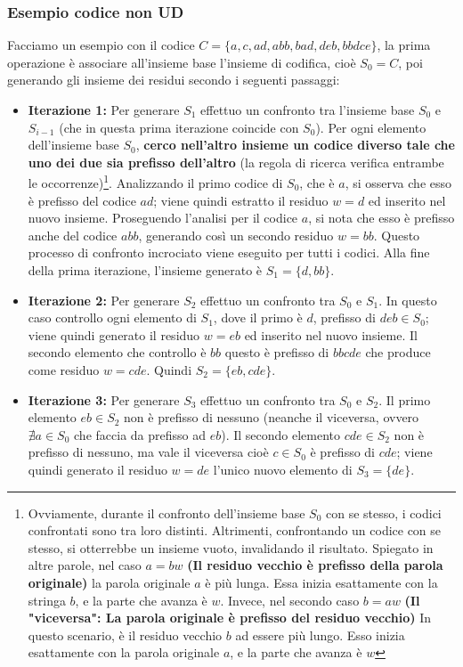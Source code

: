 \documentclass{article}
\theoremstyle{definition}
\numberwithin{equation}{section}
\begin{document}
\subsubsection{Esempio codice non UD}\label{example_sardinas_patterson_not_ud}
Facciamo un esempio con il codice $C=\{a,c,ad,abb,bad,deb,bbdce\}$, la prima operazione è associare all'insieme base l'insieme di codifica, cioè $S_0 = C$, poi generando gli insieme dei residui secondo i seguenti passaggi:
\begin{itemize}
    \item \textbf{Iterazione 1:}  Per generare $S_1$ effettuo un confronto tra l'insieme base $S_0$ e $S_{i-1}$ (che in questa prima iterazione coincide con $S_0$). Per ogni elemento dell'insieme base $S_0$, \textbf{cerco nell'altro insieme un codice diverso tale che uno dei due sia prefisso dell'altro} (la regola di ricerca verifica entrambe le occorrenze)\footnote{Ovviamente, durante il confronto dell'insieme base $S_0$ con se stesso, i codici confrontati sono tra loro distinti. Altrimenti, confrontando un codice con se stesso, si otterrebbe un insieme vuoto, invalidando il risultato. Spiegato in altre parole, nel caso $a=bw$ \textbf{(Il residuo vecchio è prefisso della parola originale)} la parola originale $a$ è più lunga. Essa inizia esattamente con la stringa $b$, e la parte che avanza è $w$. Invece, nel secondo caso $b=aw$ \textbf{(Il "viceversa": La parola originale è prefisso del residuo vecchio)} In questo scenario, è il residuo vecchio $b$ ad essere più lungo. Esso inizia esattamente con la parola originale $a$, e la parte che avanza è $w$}. Analizzando il primo codice di $S_0$, che è $a$, si osserva che esso è prefisso del codice $ad$; viene quindi estratto il residuo $w = d$ ed inserito nel nuovo insieme. Proseguendo l'analisi per il codice $a$, si nota che esso è prefisso anche del codice $abb$, generando così un secondo residuo $w = bb$. Questo processo di confronto incrociato viene eseguito per tutti i codici. Alla fine della prima iterazione, l'insieme generato è $S_1 = \{d, bb\}$.
    \item \textbf{Iterazione 2:} Per generare $S_2$ effettuo un confronto tra $S_0$ e $S_1$. In questo caso controllo ogni elemento di $S_1$, dove il primo è $d$, prefisso di $deb\in S_0$; viene quindi generato il residuo $w = eb$ ed inserito nel nuovo insieme. Il secondo elemento che controllo è $bb$ questo è prefisso di $bbcde$ che produce come residuo $w=cde$. Quindi $S_2=\{eb,cde\}$.
    \item \textbf{Iterazione 3:} Per generare $S_3$ effettuo un confronto tra $S_0$ e $S_2$. Il primo elemento $eb\in S_2$ non è prefisso di nessuno (neanche il viceversa, ovvero $\nexists a \in S_0$ che faccia da prefisso ad $eb$). Il secondo elemento $cde\in S_2$ non è prefisso di nessuno, ma vale il viceversa cioè $c\in S_0$ è prefisso di $cde$; viene quindi generato il residuo $w=de$ l'unico nuovo elemento di $S_3=\{de\}$.

\end{itemize}
\end{document}
